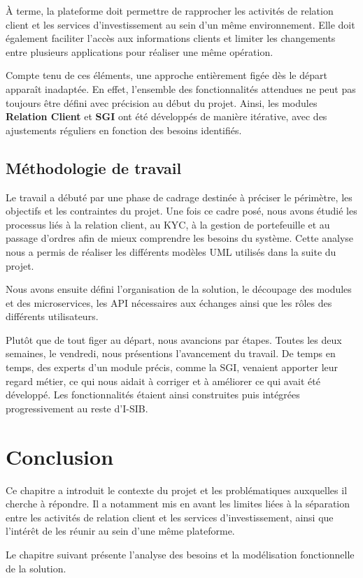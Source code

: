 À terme, la plateforme doit permettre de rapprocher les activités de relation client et les services d'investissement au sein d'un même environnement. Elle doit également faciliter l'accès aux informations clients et limiter les changements entre plusieurs applications pour réaliser une même opération.



Compte tenu de ces éléments, une approche entièrement figée dès le départ apparaît inadaptée. En effet, l'ensemble des fonctionnalités attendues ne peut pas toujours être défini avec précision au début du projet.
Ainsi, les modules \textbf{Relation Client} et \textbf{SGI} ont été développés de manière itérative, avec des ajustements réguliers en fonction des besoins identifiés.

\subsection{Méthodologie de travail}



Le travail a débuté par une phase de cadrage destinée à préciser le périmètre, les objectifs et les contraintes du projet. Une fois ce cadre posé, nous avons étudié les processus liés à la relation client, au KYC, à la gestion de portefeuille et au passage d'ordres afin de mieux comprendre les besoins du système. Cette analyse nous a permis de réaliser les différents modèles UML utilisés dans la suite du projet.

Nous avons ensuite défini l'organisation de la solution, le découpage des modules et des microservices, les API nécessaires aux échanges ainsi que les rôles des différents utilisateurs.

Plutôt que de tout figer au départ, nous avancions par étapes. Toutes les deux semaines, le vendredi, nous présentions l'avancement du travail. De temps en temps, des experts d'un module précis, comme la SGI, venaient apporter leur regard métier, ce qui nous aidait à corriger et à améliorer ce qui avait été développé. Les fonctionnalités étaient ainsi construites puis intégrées progressivement au reste d'I-SIB.









\section*{Conclusion}


Ce chapitre a introduit le contexte du projet et les problématiques auxquelles il cherche à répondre. Il a notamment mis en avant les limites liées à la séparation entre les activités de relation client et les services d'investissement, ainsi que l'intérêt de les réunir au sein d'une même plateforme.

Le chapitre suivant présente l'analyse des besoins et la modélisation fonctionnelle de la solution.
